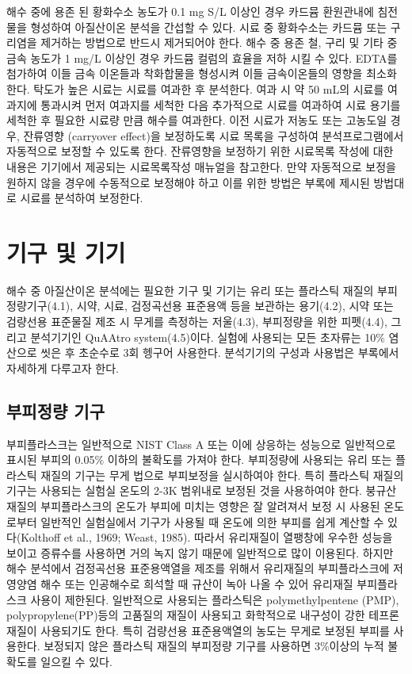 \documentclass[
]{book}
\begin{document}
해수 중에 용존 된 황화수소 농도가 0.1 mg S/L 이상인 경우 카드뮴 환원관내에 침전물을 형성하여 아질산이온 분석을 간섭할 수 있다. 시료 중 황화수소는 카드뮴 또는 구리염을 제거하는 방법으로 반드시 제거되어야 한다.
해수 중 용존 철, 구리 및 기타 중금속 농도가 1 mg/L 이상인 경우 카드뮴 컬럼의 효율을 저하 시킬 수 있다. EDTA를 첨가하여 이들 금속 이온들과 착화합물을 형성시켜 이들 금속이온들의 영향을 최소화한다.
탁도가 높은 시료는 시료를 여과한 후 분석한다. 여과 시 약 50 mL의 시료를 여과지에 통과시켜 먼저 여과지를 세척한 다음 추가적으로 시료를 여과하여 시료 용기를 세척한 후 필요한 시료량 만큼 해수를 여과한다.
이전 시료가 저농도 또는 고농도일 경우, 잔류영향 (carryover effect)을 보정하도록 시료 목록을 구성하여 분석프로그램에서 자동적으로 보정할 수 있도록 한다. 잔류영향을 보정하기 위한 시료목록 작성에 대한 내용은 기기에서 제공되는 시료목록작성 매뉴얼을 참고한다. 만약 자동적으로 보정을 원하지 않을 경우에 수동적으로 보정해야 하고 이를 위한 방법은 부록에 제시된 방법대로 시료를 분석하여 보정한다.

\hypertarget{uxae30uxad6c-uxbc0f-uxae30uxae30}{%
\section{기구 및 기기}\label{uxae30uxad6c-uxbc0f-uxae30uxae30}}

해수 중 아질산이온 분석에는 필요한 기구 및 기기는 유리 또는 플라스틱 재질의 부피정량기구(4.1), 시약, 시료, 검정곡선용 표준용액 등을 보관하는 용기(4.2), 시약 또는 검량선용 표준물질 제조 시 무게를 측정하는 저울(4.3), 부피정량을 위한 피펫(4.4), 그리고 분석기기인 QuAAtro system(4.5)이다. 실험에 사용되는 모든 초자류는 10\% 염산으로 씻은 후 초순수로 3회 헹구어 사용한다. 분석기기의 구성과 사용법은 부록에서 자세하게 다루고자 한다.

\hypertarget{uxbd80uxd53cuxc815uxb7c9-uxae30uxad6c}{%
\subsection{부피정량 기구}\label{uxbd80uxd53cuxc815uxb7c9-uxae30uxad6c}}

부피플라스크는 일반적으로 NIST Class A 또는 이에 상응하는 성능으로 일반적으로 표시된 부피의 0.05\% 이하의 불확도를 가져야 한다. 부피정량에 사용되는 유리 또는 플라스틱 재질의 기구는 무게 법으로 부피보정을 실시하여야 한다. 특히 플라스틱 재질의 기구는 사용되는 실험실 온도의 2-3K 범위내로 보정된 것을 사용하여야 한다. 붕규산 재질의 부피플라스크의 온도가 부피에 미치는 영향은 잘 알려져서 보정 시 사용된 온도로부터 일반적인 실험실에서 기구가 사용될 때 온도에 의한 부피를 쉽게 계산할 수 있다(Kolthoff et al., 1969; Weast, 1985). 따라서 유리재질이 열팽창에 우수한 성능을 보이고 증류수를 사용하면 거의 녹지 않기 때문에 일반적으로 많이 이용된다.
하지만 해수 분석에서 검정곡선용 표준용액열을 제조를 위해서 유리재질의 부피플라스크에 저영양염 해수 또는 인공해수로 희석할 때 규산이 녹아 나올 수 있어 유리재질 부피플라스크 사용이 제한된다. 일반적으로 사용되는 플라스틱은 polymethylpentene (PMP), polypropylene(PP)등의 고품질의 재질이 사용되고 화학적으로 내구성이 강한 테프론 재질이 사용되기도 한다. 특히 검량선용 표준용액열의 농도는 무게로 보정된 부피를 사용한다. 보정되지 않은 플라스틱 재질의 부피정량 기구를 사용하면 3\%이상의 누적 불확도를 일으킬 수 있다.
\end{document}
